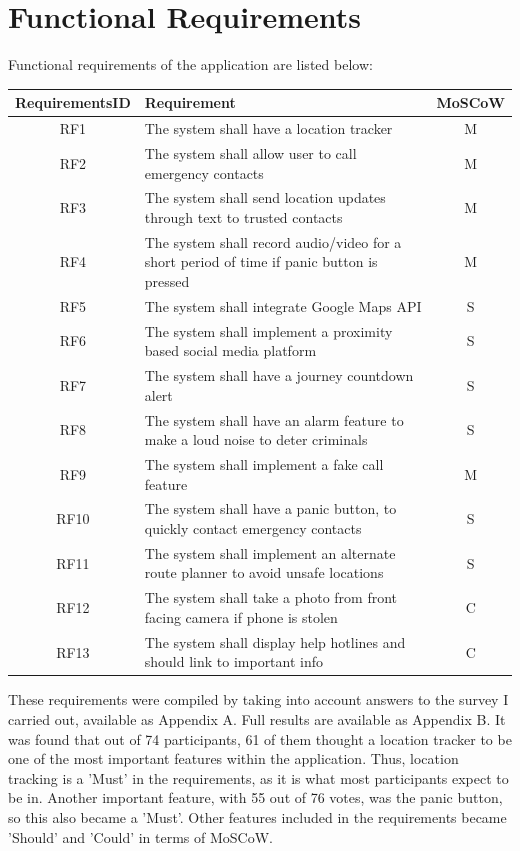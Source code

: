 \documentclass[a4paper]{report}
\begin{document}
\section{Functional Requirements} 
\label{sec:FunctionalReq}
Functional requirements of the application are listed below:
\noindent
\begin{center}

  \begin{tabular} [htbp] {|c|p{75mm}|c|}
    \hline
    RequirementsID & Requirement & MoSCoW \\
    \hline
    RF1 & The system shall have a location tracker & M \\
    \hline
    RF2 & The system shall allow user to call emergency contacts & M \\
    \hline
    RF3 & The system shall send location updates through text to trusted contacts & M \\
    \hline
    RF4 & The system shall record audio/video for a short period of time if panic button is pressed & M \\
    \hline
    RF5 & The system shall integrate Google Maps API & S \\
    \hline
    RF6 & The system shall implement a proximity based social media platform & S \\
    \hline
    RF7 & The system shall have a journey countdown alert & S \\
    \hline
    RF8 & The system shall have an alarm feature to make a loud noise to deter criminals & S \\
    \hline
    RF9 & The system shall implement a fake call feature & M \\
    \hline
    RF10 & The system shall have a panic button, to  quickly contact emergency contacts & S \\
    \hline 
    RF11 & The system shall implement an alternate route planner to avoid unsafe locations & S \\
    \hline
    RF12 & The system shall take a photo from front facing camera if phone is stolen & C \\
    \hline
    RF13 & The system shall display help hotlines and should link to important info & C \\
    \hline
  \end{tabular}
\end{center}
\newpage
These requirements were compiled by taking into account answers to the survey I carried out, available as Appendix A. Full results are available as Appendix B. It was found that out of 74 participants, 61 of them thought a location tracker to be one of the most important features within the application. Thus, location tracking is a 'Must' in the requirements, as it is what most participants expect to be in. Another important feature, with 55 out of 76 votes, was the panic button, so this also became a 'Must'. Other features included in the requirements became 'Should' and 'Could' in terms of MoSCoW.
\end{document}
